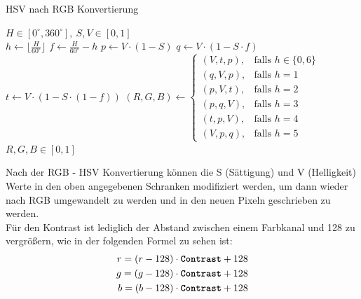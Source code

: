 \begin{itemize}
	\begin{algorithm}[H]
	\caption{HSV nach RGB Konvertierung}
		\begin{algorithmic}[1]
			\REQUIRE $ H \in [0^{\circ}, 360^{\circ}],\ S, V \in [0, 1] $ \\
			\STATE $ h \gets \lfloor\frac{H}{60^\circ}\rfloor $
			\STATE $ f \gets \frac{H}{60^{\circ}} - h $
			\STATE $ p \gets V \cdot (1 - S) $ 
			\STATE $ q \gets V \cdot (1 - S \cdot f) $
			\STATE $ t \gets V \cdot (1 - S \cdot (1 - f)) $
			\vspace{5px}
			\STATE $
						(R, G, B) \gets
						\begin{cases}
							(V, t, p), & \text{falls } h \in \{0, 6\} \\
							(q, V, p), & \text{falls } h = 1 \\
							(p, V, t), & \text{falls } h = 2 \\
							(p, q, V), & \text{falls } h = 3 \\
							(t, p, V), & \text{falls } h = 4 \\
							(V, p, q), & \text{falls } h = 5
						\end{cases}
					$
			\vspace{5px}
			\ENSURE $ R, G, B \in [0, 1] $ \\
		\end{algorithmic}
	\end{algorithm} 

	Nach der RGB - HSV Konvertierung können die S (Sättigung) und V (Helligkeit) Werte in den oben angegebenen Schranken modifiziert werden, um dann wieder nach RGB umgewandelt zu werden und in den neuen Pixeln geschrieben zu werden. \\
	Für den Kontrast ist lediglich der Abstand zwischen einem Farbkanal und 128 zu vergrößern, wie in der folgenden Formel zu sehen ist: \begin{eqnarray}
   r = (r - 128) \cdot \text{\textbf{\texttt{Contrast}}} + 128 \\
	g = (g - 128) \cdot \text{\textbf{\texttt{Contrast}}} + 128 \\
	b = (b - 128) \cdot \text{\textbf{\texttt{Contrast}}} + 128
\end{eqnarray}

\end{itemize}

